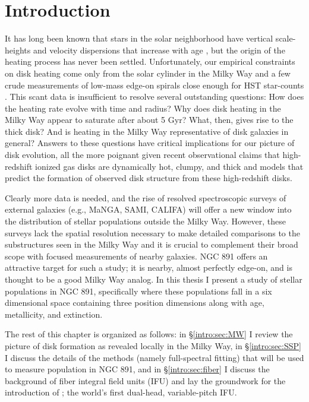 \chapter[Introduction]{Introduction}
\label{chap:intro}


\clearpage
It has long been known that stars in the solar neighborhood have
vertical scale-heights and velocity dispersions that increase with age
\citep[e.g.,][]{Wielen74}, but the origin of the heating process has
never been settled. Unfortunately, our empirical constraints on disk
heating come only from the solar cylinder in the Milky Way and a few
crude measurements of low-mass edge-on spirals close enough for HST
star-counts \citep{Seth05a}. This scant data is insufficient to resolve
several outstanding questions: How does the heating rate evolve with
time and radius?  Why does disk heating in the Milky Way appear to
saturate after about 5 Gyr?  What, then, gives rise to the thick disk?
And is heating in the Milky Way representative of disk galaxies in
general? Answers to these questions have critical implications for our
picture of disk evolution, all the more poignant given recent
observational claims that high-redshift ionized gas disks are
dynamically hot, clumpy, and thick \citep{Forster-Schreiber09} and
models \citep{Bird13} that predict the formation of observed disk
structure from these high-redshift disks.

Clearly more data is needed, and the rise of resolved spectroscopic
surveys of external galaxies (e.g., MaNGA, SAMI, CALIFA) will offer a
new window into the distribution of stellar populations outside the
Milky Way. However, these surveys lack the spatial resolution
necessary to make detailed comparisons to the substructures seen in
the Milky Way and it is crucial to complement their broad scope with
focused measurements of nearby galaxies. NGC 891 offers an attractive
target for such a study; it is nearby, almost perfectly edge-on, and
is thought to be a good Milky Way analog. In this thesis I present a
study of stellar populations in NGC 891, specifically where these
populations fall in a six dimensional space containing three position
dimensions along with age, metallicity, and extinction.

The rest of this chapter is organized as follows: in
\S\ref{intro:sec:MW} I review the picture of disk formation as
revealed locally in the Milky Way, in \S\ref{intro:sec:SSP} I discuss
the details of the methods (namely full-spectral fitting) that will be
used to measure population in NGC 891, and in \S\ref{intro:sec:fiber}
I discuss the background of fiber integral field units (IFU) and lay
the groundwork for the introduction of \GP; the world's first
dual-head, variable-pitch IFU.


